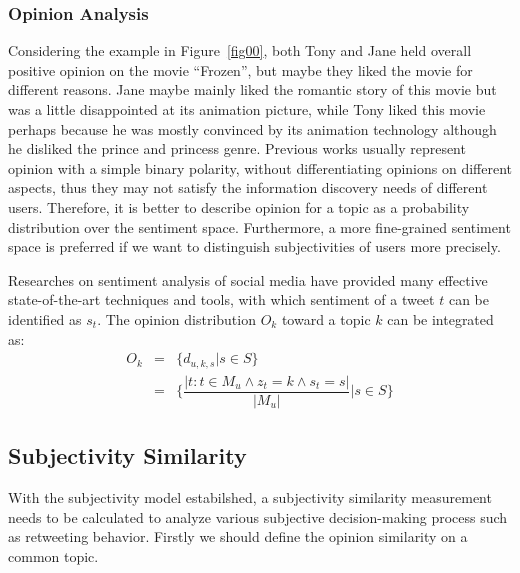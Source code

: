 \documentclass[letterpaper]{article}
\begin{document}
\subsubsection{Opinion Analysis}
\label{opinion}

Considering the example in Figure~\ref{fig00}, both Tony and Jane held overall positive opinion on the movie ``Frozen'', but maybe they liked the movie for different reasons. Jane maybe mainly liked the romantic story of this movie but was a little disappointed at its animation picture, while Tony liked this movie perhaps because he was mostly convinced by its animation technology although he disliked the prince and princess genre. Previous works usually represent opinion with a simple binary polarity, without differentiating opinions on different aspects, thus they may not satisfy the information discovery needs of different users. Therefore, it is better to describe opinion for a topic as a probability distribution over the sentiment space. Furthermore, a more fine-grained sentiment space is preferred if we want to distinguish subjectivities of users more precisely.

Researches on sentiment analysis of social media have provided many effective state-of-the-art techniques and tools\cite{thelwall2010sentiment,hu2013unsupervised}, with which sentiment of a tweet $ t $ can be identified as $ s_t $. The opinion distribution $ O_k $ toward a topic $ k $ can be integrated as:
\begin{eqnarray}
O_k &= & \{ d_{u,k,s}|s \in S \} \nonumber \\
  &=& \{ \dfrac{|t:t \in M_u \wedge z_t=k \wedge s_t=s|}{|M_u|}|s \in S\}
\end{eqnarray}

\subsection{Subjectivity Similarity}
\label{similarity}

With the subjectivity model estabilshed, a subjectivity similarity measurement needs to be calculated to analyze various subjective decision-making process such as retweeting behavior. 
Firstly we should define the opinion similarity on a common topic. 
 
\end{document}
